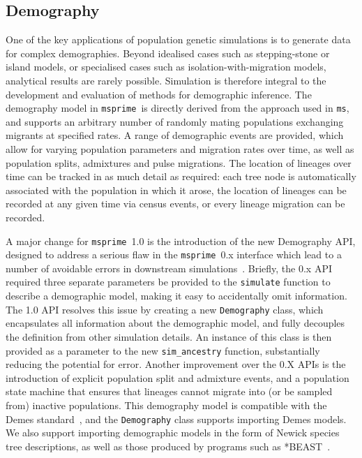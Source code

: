 \documentclass{article}
\newcommand{\msprime}[0]{\texttt{msprime}}
\newcommand{\ms}[0]{\texttt{ms}}
\begin{document}
\subsection{Demography}
One of the key applications of population genetic simulations is to generate
data for complex demographies. Beyond idealised cases such as stepping-stone or
island models, or specialised cases such as isolation-with-migration models,
analytical results are rarely possible. Simulation is therefore integral to the
development and evaluation of methods for demographic inference. The demography
model in \msprime\ is directly derived from the approach used in \ms, and
supports an arbitrary number of randomly mating populations exchanging migrants
at specified rates. A range of demographic events are provided, which allow for
varying population parameters and migration rates over time, as well as
population splits, admixtures and pulse migrations. The location of lineages
over time can be tracked in as much detail as required: each tree node is
automatically associated with the population in which it arose, the location of
lineages can be recorded at any given time via census events, or every lineage
migration can be recorded.

A major change for \msprime\ 1.0 is the introduction of the new Demography API,
designed to address a serious flaw in the \msprime\ 0.x interface which lead to
a number of avoidable errors in downstream
simulations~\citep{ragsdale2020lessons}. Briefly, the 0.x API required three
separate parameters be provided to the \texttt{simulate} function to describe a
demographic model, making it easy to accidentally omit information. The 1.0 API
resolves this issue by creating a new \texttt{Demography} class, which
encapsulates all information about the demographic model, and fully decouples
the definition from other simulation details. An instance of this class is then
provided as a parameter to the new \texttt{sim\_ancestry} function,
substantially reducing the potential for error. Another improvement over the
0.X APIs is the introduction of explicit population split and admixture events,
and a population state machine that ensures that lineages cannot migrate into
(or be sampled from) inactive populations. This demography model is compatible
with the Demes standard~\citep{gower2021demes}, and the \texttt{Demography}
class supports importing Demes models. We also support importing demographic
models in the form of Newick species tree descriptions, as well as those
produced by programs such as *BEAST~\citep{heled2009bayesian}.
\end{document}

